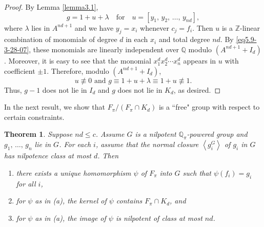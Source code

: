 \documentclass[mathscr]{amsart}
\theoremstyle{theorem}
\newtheorem{theorem}{Theorem}[section]
\theoremstyle{definition}
\numberwithin{equation}{section}
\def \({\left(}
\def \){\right)}
\begin{document}
\begin{proof}
By Lemma \ref{lemma3.1},
$$
g=1+u+\lambda\quad\text{for}\quad
u=\left[y_1,\,y_2,\,\dots,\,y_{nd}\right],
$$
where $\lambda$ lies in $A^{nd+1}$ and we have $y_j=x_i$ whenever
$c_j=f_i$.  Then $u$ is a $\mathbb{Z}$-linear combination of
monomials of degree $d$ in each $x_i$ and total degree $nd$.  By
\eqref{eq5.9-3-28-07}, these monomials are linearly independent over
$\mathbb{Q}$ modulo $\(A^{nd+1}+I_d\)$.  Moreover, it is easy to see
that the monomial $x_1^dx_2^d\cdots x_n^d$ appears in $u$ with
coefficient $\pm 1$. Therefore, modulo $\(A^{nd+1}+I_d\)$,
$$
u\not\equiv 0\text{ and }g\equiv 1+u+\lambda \equiv 1+u\not\equiv 1.
$$
Thus, $g-1$ does not lie in $I_d$ and $g$ does not lie in $K_d$, as
desired.
\end{proof}

In the next result, we show that $F_\pi/(F_\pi\cap K_d)$ is a
``free" group with respect to certain constraints.

\begin{theorem}\label{theo5.7-3-30-07}
Suppose $nd\leq c$.  Assume $G$ is a nilpotent
$\mathbb{Q}_\pi$-powered group and $g_1,\,\dots,\,g_n$ lie in $G$.
For each $i$, assume that the normal closure $\left\langle
g_i^G\right\rangle$ of $g_i$ in $G$ has nilpotence class at most
$d$.  Then
\begin{enumerate}
\item[(a)] there exists a unique homomorphism $\psi$ of $F_\pi$ into
$G$ such that $\psi\(f_i\)=g_i$ for all $i$,
\item[(b)] for $\psi$ as in (a), the kernel of $\psi$ contains
$F_\pi\cap K_d$, and
\item[(c)] for $\psi$ as in (a), the image of $\psi$ is nilpotent of
class at most $nd$.
\end{enumerate}
\end{theorem}
\end{document}

